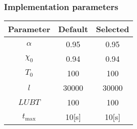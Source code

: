 \begin{homeworkProblem}
\subsubsection{Implementation parameters}
\begin{center}
\begin{tabular}{|c|c|c|}
\hline
\textbf{Parameter} & \textbf{Default} & \textbf{Selected} \\ \hline 
$\alpha$ & 0.95 & 0.95 \\\hline 
$\chi_0$ & 0.94 & 0.94 \\ \hline
$T_0$ & 100 & 100 \\ \hline 
$l$ & 30000 & 30000 \\ \hline 
$LUBT$ & 100 & 100 \\ \hline 
$t_{\max}$ & 10[s] & 10[s] \\
\hline
\end{tabular}
\label{saParameters}
\end{center}

\end{homeworkProblem}		
